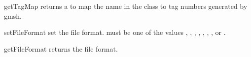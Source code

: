 \begin{methoddesc}[Design]{getTagMap}{}
returns a  to map the name  in the class to tag numbers generated by gmsh.
\end{methoddesc}

\begin{methoddesc}[Design]{setFileFormat}{}
set the file format.  must be one of the values
,
,
,
,
,
,
,
 or
.
\end{methoddesc}

\begin{methoddesc}[Design]{getFileFormat}{}
returns the file format.
\end{methoddesc}
